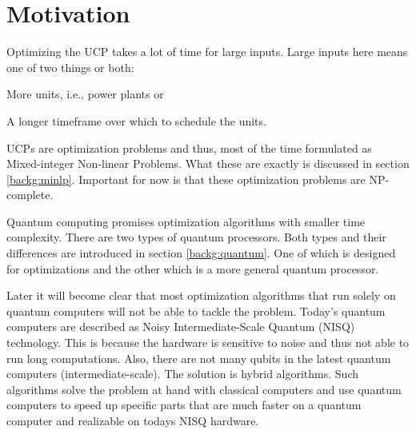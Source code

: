 \section{Motivation}

Optimizing the UCP takes a lot of time for large inputs.
Large inputs here means one of two things or both:
\begin{enumerate*}[label=(\roman*)]
  \item More units, i.e., power plants or
  \item A longer timeframe over which to schedule the units.
\end{enumerate*}
UCPs are optimization problems and thus, most of the time formulated as Mixed-integer Non-linear Problems.
\cite{Baldick1995}
What these are exactly is discussed in section \ref{backg:minlp}.
Important for now is that these optimization problems are NP-complete.
\cite{Li2005, Bienstock1996}

Quantum computing promises optimization algorithms with smaller time complexity.
\cite{Portnov2000, Ahuja1999, Gilliam2019, Ajagekar2020, Shaydulin2019}
There are two types of quantum processors.
Both types and their differences are introduced in section \ref{backg:quantum}.
One of which is designed for optimizations and the other which is a more general quantum processor.

Later it will become clear that most optimization algorithms that run solely on quantum computers will not be able to tackle the problem.
Today's quantum computers are described as Noisy Intermediate-Scale Quantum (NISQ) technology.
This is because the hardware is sensitive to noise and thus not able to run long computations.
Also, there are not many qubits in the latest quantum computers (intermediate-scale).
\cite{Leymann2020}
The solution is hybrid algorithms.
Such algorithms solve the problem at hand with classical computers and use quantum computers to speed up specific parts that are much faster on a quantum computer and realizable on todays NISQ hardware.
\cite{Ajagekar2020, Shaydulin2019}

